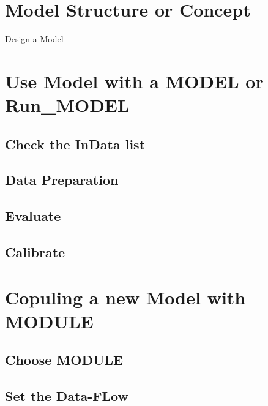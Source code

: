 \documentclass[
]{book}
\begin{document}
\hypertarget{model-structure-or-concept}{%
\section{Model Structure or Concept}\label{model-structure-or-concept}}

Design a Model

\hypertarget{use-model-with-a-model-or-run_model}{%
\section{Use Model with a MODEL or Run\_MODEL}\label{use-model-with-a-model-or-run_model}}

\hypertarget{check-the-indata-list}{%
\subsection{Check the InData list}\label{check-the-indata-list}}

\hypertarget{data-preparation}{%
\subsection{Data Preparation}\label{data-preparation}}

\hypertarget{evaluate}{%
\subsection{Evaluate}\label{evaluate}}

\hypertarget{calibrate}{%
\subsection{Calibrate}\label{calibrate}}

\hypertarget{copuling-a-new-model-with-module}{%
\section{Copuling a new Model with MODULE}\label{copuling-a-new-model-with-module}}

\hypertarget{choose-module}{%
\subsection{Choose MODULE}\label{choose-module}}

\hypertarget{set-the-data-flow}{%
\subsection{Set the Data-FLow}\label{set-the-data-flow}}
\end{document}
